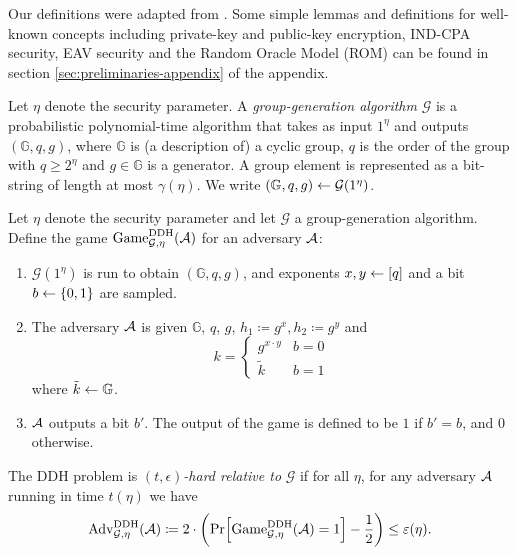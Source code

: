 Our definitions were adapted from \cite{introduction-to-modern-cryptography}. Some simple lemmas and definitions for well-known concepts including private-key and public-key encryption, IND-CPA security, EAV security and the Random Oracle Model (ROM) can be found in section \ref{sec:preliminaries-appendix} of the appendix.

\begin{definition} \label{def:group-generation-algorithm}
	Let $\eta$ denote the security parameter. A \emph{group-generation algorithm} $\mathcal{G}$ is a probabilistic polynomial-time algorithm that takes as input $1^\eta$ and outputs $(\mathbb{G}, q, g)$, where $\mathbb{G}$ is (a description of) a cyclic group, $q$ is the order of the group with $q \ge 2^\eta$ and $g \in \mathbb{G}$ is a generator. A group element is represented as a bit-string of length at most $\gamma(\eta)$. We write $(\mathbb{G}, q, g) \leftarrow \mathcal{G}(1^\eta)$.
\end{definition}

\begin{definition}
	Let $\eta$ denote the security parameter and let $\mathcal{G}$ a group-generation algorithm.
	Define the game $\mathrm{Game}_{\mathcal{G}, \eta}^{\mathrm{DDH}}(\mathcal{A})$ for an adversary $\mathcal{A}$:
	\begin{enumerate}[1.]
		\item $\mathcal{G}(1^\eta)$ is run to obtain $(\mathbb{G}, q, g)$, and exponents $x, y \leftarrow [q]$ and a bit $b \leftarrow \{0, 1\}$ are sampled.
		\item The adversary $\mathcal{A}$ is given $\mathbb{G}$, $q$, $g$, $h_1 \coloneqq g^x, h_2 \coloneqq g^y$ and
		      \[
			      k = \begin{cases}
				      g^{x \cdot y} & b = 0 \\
				      \tilde{k}     & b = 1
			      \end{cases}
		      \]
		      where $\tilde{k} \leftarrow \mathbb{G}$.
		\item $\mathcal{A}$ outputs a bit $b'$. The output of the game is defined to be $1$ if $b' = b$, and $0$ otherwise.
	\end{enumerate}
\end{definition}

\begin{definition}
	The DDH problem is \emph{$(t, \epsilon)$-hard relative to} $\mathcal{G}$ if for all $\eta$, for any adversary $\mathcal{A}$ running in time $t(\eta)$ we have
	\begin{align*}
		\advantage{\mathcal{G}}{\eta}{DDH}(\adv) \coloneqq 2 \cdot \left(\pr{\game{\mathcal{G}}{\eta}{DDH}(\adv) = 1} - \frac{1}{2}\right) \le \epsilon(\eta).
	\end{align*}
\end{definition}

